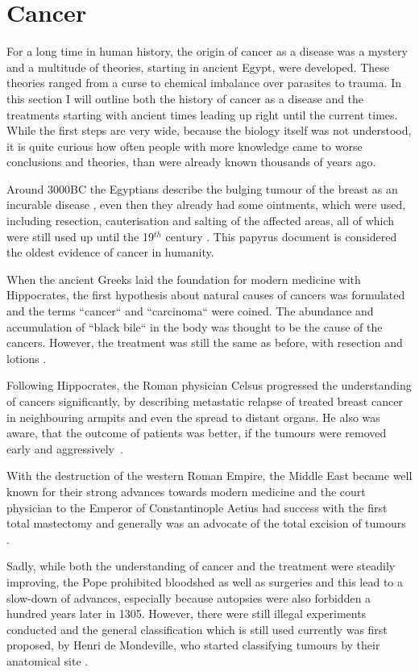 \section{Cancer}
\label{intro-sec:cancer}

For a long time in human history, the origin of cancer as a disease was a mystery and a multitude of theories, starting in ancient Egypt, were developed. These theories ranged from a curse to chemical imbalance over parasites to trauma. In this section I will outline both the history of cancer as a disease and the treatments starting with ancient times leading up right until the current times. While the first steps are very wide, because the biology itself was not understood, it is quite curious how often people with more knowledge came to worse conclusions and theories, than were already known thousands of years ago.

Around 3000BC the Egyptians describe the bulging tumour of the breast as an incurable disease \cite{Breasted1930}, even then they already had some ointments, which were used, including resection, cauterisation and salting of the affected areas, all of which were still used up until the 19$^{th}$ century \cite{Hajdu2004}. This papyrus document is considered the oldest evidence of cancer in humanity.

When the ancient Greeks laid the foundation for modern medicine with Hippocrates, the first hypothesis about natural causes of cancers was formulated and the terms ``cancer`` and ``carcinoma`` were coined. The abundance and accumulation of ``black bile`` in the body was thought to be the cause of the cancers. However, the treatment was still the same as before, with resection and lotions \cite{Chadwick1950}.

Following Hippocrates, the Roman physician Celsus progressed the understanding of cancers significantly, by describing metastatic relapse of treated breast cancer in neighbouring armpits and even the spread to distant organs. He also was aware, that the outcome of patients was better, if the tumours were removed early and aggressively~\cite{Celsus1939}.

With the destruction of the western Roman Empire, the Middle East became well known for their strong advances towards modern medicine and the court physician to the Emperor of Constantinople Aetius had success with the first total mastectomy and generally was an advocate of the total excision of tumours \cite{Browne2012}. 

Sadly, while both the understanding of cancer and the treatment were steadily improving, the Pope prohibited bloodshed as well as surgeries and this lead to a slow-down of advances, especially because autopsies were also forbidden a hundred years later in 1305. However, there were still illegal experiments conducted and the general classification which is still used currently was first proposed, by Henri de Mondeville, who started classifying tumours by their anatomical site \cite{Pilcher1895}.

